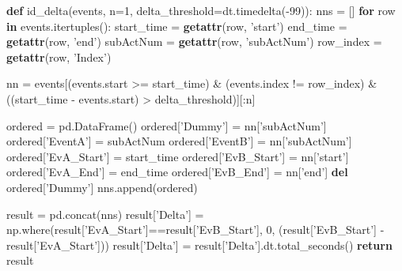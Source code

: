 \documentclass[11pt,]{article}
\newenvironment{Shaded}{\begin{snugshade}}{\end{snugshade}}
\newcommand{\BuiltInTok}[1]{\textcolor[rgb]{0.39,0.29,0.61}{\textbf{#1}}}
\newcommand{\ControlFlowTok}[1]{\textcolor[rgb]{0.12,0.11,0.11}{\textbf{#1}}}
\newcommand{\DecValTok}[1]{\textcolor[rgb]{0.69,0.50,0.00}{#1}}
\newcommand{\KeywordTok}[1]{\textcolor[rgb]{0.12,0.11,0.11}{\textbf{#1}}}
\newcommand{\NormalTok}[1]{\textcolor[rgb]{0.12,0.11,0.11}{#1}}
\newcommand{\OperatorTok}[1]{\textcolor[rgb]{0.12,0.11,0.11}{#1}}
\newcommand{\StringTok}[1]{\textcolor[rgb]{0.75,0.01,0.01}{#1}}
\begin{document}
\begin{Shaded}
\begin{Highlighting}[]
\KeywordTok{def}\NormalTok{ id_delta(events, n}\OperatorTok{=}\DecValTok{1}\NormalTok{, delta_threshold}\OperatorTok{=}\NormalTok{dt.timedelta(}\OperatorTok{-}\DecValTok{99}\NormalTok{)):}
\NormalTok{    nns }\OperatorTok{=}\NormalTok{ []}
    \ControlFlowTok{for}\NormalTok{ row }\KeywordTok{in}\NormalTok{ events.itertuples():}
\NormalTok{        start_time }\OperatorTok{=} \BuiltInTok{getattr}\NormalTok{(row, }\StringTok{'start'}\NormalTok{)}
\NormalTok{        end_time }\OperatorTok{=} \BuiltInTok{getattr}\NormalTok{(row, }\StringTok{'end'}\NormalTok{)}
\NormalTok{        subActNum }\OperatorTok{=} \BuiltInTok{getattr}\NormalTok{(row, }\StringTok{'subActNum'}\NormalTok{)}
\NormalTok{        row_index }\OperatorTok{=} \BuiltInTok{getattr}\NormalTok{(row, }\StringTok{'Index'}\NormalTok{)}
        
\NormalTok{        nn }\OperatorTok{=}\NormalTok{ events[(events.start }\OperatorTok{>=}\NormalTok{ start_time) }\OperatorTok{&} 
\NormalTok{                    (events.index }\OperatorTok{!=}\NormalTok{ row_index) }\OperatorTok{&} 
\NormalTok{                    ((start_time }\OperatorTok{-}\NormalTok{ events.start) }\OperatorTok{>}\NormalTok{ delta_threshold)][:n]}
        
\NormalTok{        ordered }\OperatorTok{=}\NormalTok{ pd.DataFrame()}
\NormalTok{        ordered[}\StringTok{'Dummy'}\NormalTok{] }\OperatorTok{=}\NormalTok{ nn[}\StringTok{'subActNum'}\NormalTok{]}
\NormalTok{        ordered[}\StringTok{'EventA'}\NormalTok{] }\OperatorTok{=}\NormalTok{ subActNum}
\NormalTok{        ordered[}\StringTok{'EventB'}\NormalTok{] }\OperatorTok{=}\NormalTok{ nn[}\StringTok{'subActNum'}\NormalTok{]}
\NormalTok{        ordered[}\StringTok{'EvA_Start'}\NormalTok{] }\OperatorTok{=}\NormalTok{ start_time}
\NormalTok{        ordered[}\StringTok{'EvB_Start'}\NormalTok{] }\OperatorTok{=}\NormalTok{ nn[}\StringTok{'start'}\NormalTok{]}
\NormalTok{        ordered[}\StringTok{'EvA_End'}\NormalTok{] }\OperatorTok{=}\NormalTok{ end_time}
\NormalTok{        ordered[}\StringTok{'EvB_End'}\NormalTok{] }\OperatorTok{=}\NormalTok{ nn[}\StringTok{'end'}\NormalTok{]}
        \KeywordTok{del}\NormalTok{ ordered[}\StringTok{'Dummy'}\NormalTok{]}
\NormalTok{        nns.append(ordered)}
  
    
\NormalTok{    result }\OperatorTok{=}\NormalTok{ pd.concat(nns)}
\NormalTok{    result[}\StringTok{'Delta'}\NormalTok{] }\OperatorTok{=}\NormalTok{ np.where(result[}\StringTok{'EvA_Start'}\NormalTok{]}\OperatorTok{==}\NormalTok{result[}\StringTok{'EvB_Start'}\NormalTok{], }
                               \DecValTok{0}\NormalTok{,}
\NormalTok{                               (result[}\StringTok{'EvB_Start'}\NormalTok{] }\OperatorTok{-}\NormalTok{ result[}\StringTok{'EvA_Start'}\NormalTok{]))}
\NormalTok{    result[}\StringTok{'Delta'}\NormalTok{] }\OperatorTok{=}\NormalTok{ result[}\StringTok{'Delta'}\NormalTok{].dt.total_seconds()}
    \ControlFlowTok{return}\NormalTok{ result}
\end{Highlighting}
\end{Shaded}
\end{document}
